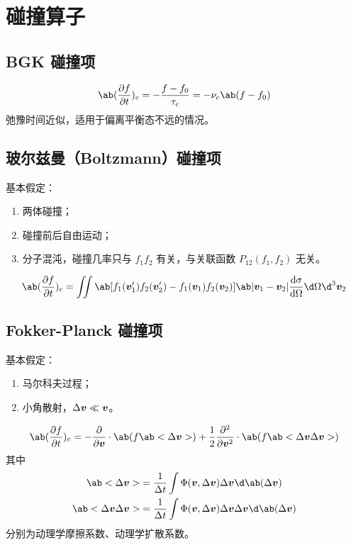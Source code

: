 
\chapter{碰撞算子}

\section{BGK 碰撞项}

\begin{equation}
\ab(\pdv{f}{t})_c = - \frac{f - f_0}{\tau_c} = - \nu_c \ab(f - f_0)
\end{equation}
弛豫时间近似，适用于偏离平衡态不远的情况。

\section{玻尔兹曼（Boltzmann）碰撞项}

基本假定：
\begin{enumerate}
    \item 两体碰撞；
    \item 碰撞前后自由运动；
    \item 分子混沌，碰撞几率只与 $f_1 f_2$ 有关，与关联函数 $P_{12}(f_1,f_2)$ 无关。
\end{enumerate}

\begin{equation}
\ab(\pdv{f}{t})_c = \iint \ab[
    f_1(\vector{v}_1') f_2(\vector{v}_2')
    - f_1(\vector{v}_1) f_2(\vector{v}_2)
] \ab|\vector{v}_1 - \vector{v}_2| \odv{\sigma}{\Omega}
\d\Omega \d^3\vector{v}_2
\end{equation}

\section{Fokker-Planck 碰撞项}

基本假定：
\begin{enumerate}
    \item 马尔科夫过程；
    \item 小角散射，$\Delta\bm{v}\ll\bm{v}$。
\end{enumerate}

\begin{equation}
\ab(\pdv{f}{t})_c =
- \pdv{}{\vector{v}} \cdot \ab(f \ab<\Delta\vector{v}>)
+ \frac{1}{2} \pdv[2]{}{\vector{v}} \cdot
\ab(f \ab<\Delta\vector{v} \Delta\vector{v}>)
\end{equation}
其中
\begin{subequations}\begin{align}
\ab<\Delta\vector{v}> &= \frac{1}{\Delta t}
\int \Phi(\vector{v}, \Delta\vector{v})
\Delta\vector{v} \d\ab(\Delta\vector{v}) \\
\ab<\Delta\vector{v}\Delta\vector{v}> &= \frac{1}{\Delta t}
\int \Phi(\vector{v}, \Delta\vector{v})
\Delta\vector{v}\Delta\vector{v} \d\ab(\Delta\vector{v})
\end{align}\end{subequations}
分别为动理学摩擦系数、动理学扩散系数。

